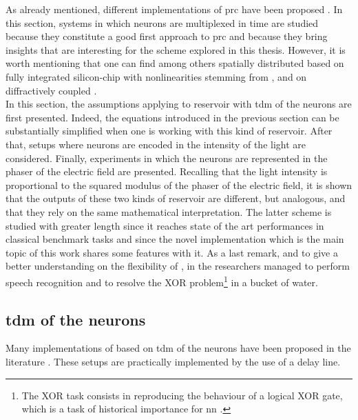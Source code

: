 \label{prc}

As already mentioned, different implementations of \gls{prc} have been proposed \cite{VanderSande2017}. In this section, systems in which neurons are multiplexed in time are studied because they constitute a good first approach to \gls{prc} and because they bring insights that are interesting for the scheme explored in this thesis. However, it is worth mentioning that one can find among others spatially distributed \rcer based on fully integrated silicon-chip with nonlinearities stemming from  \cite{Vandoorne2014}, and on diffractively coupled  \cite{Brunner2015}. \\

In this section, the assumptions applying to reservoir with \gls{tdm} of the neurons are first presented. Indeed, the equations introduced in the previous section can be substantially simplified when one is working with this kind of reservoir. After that, setups where neurons are encoded in the intensity of the light are considered. Finally, experiments in which the neurons are represented in the phaser of the electric field are presented. Recalling that the light intensity is proportional to the squared modulus of the phaser of the electric field, it is shown that the outputs of these two kinds of reservoir are different, but analogous, and that they rely on the same mathematical interpretation. The latter scheme is studied with greater length since it reaches state of the art performances in classical benchmark tasks and since the novel implementation which is the main topic of this work shares some features with it. As a last remark, and to give a better understanding on the flexibility of \rcer, in \cite{Fernando2003} the researchers managed to perform speech recognition and to resolve the XOR problem\footnote{The XOR task consists in reproducing the behaviour of a logical XOR gate, which is a task of historical importance for \gls{nn} \cite{minsky1969perceptrons}.} in a bucket of water.\\


\subsection{\acrlong{tdm} of the neurons}

 Many implementations of \rcer based on \gls{tdm} of the neurons have been proposed in the literature \cite{Paquot2012, Antonik2017, Duport2016, Dejonckheere2014, Vandoorne2008, Vinckier2015}. These setups are practically implemented by the use of a delay line.
 
